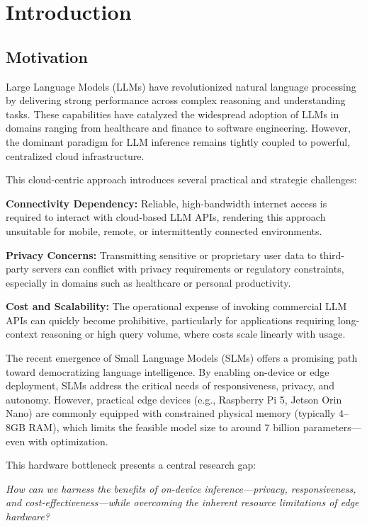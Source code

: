 \chapter{Introduction}
\label{chapter:intro}

\section{Motivation}
Large Language Models (LLMs) have revolutionized natural language processing by delivering strong performance across complex reasoning and understanding tasks. These capabilities have catalyzed the widespread adoption of LLMs in domains ranging from healthcare and finance to software engineering. However, the dominant paradigm for LLM inference remains tightly coupled to powerful, centralized cloud infrastructure.

This cloud-centric approach introduces several practical and strategic challenges:

\textbf{Connectivity Dependency:} Reliable, high-bandwidth internet access is required to interact with cloud-based LLM APIs, rendering this approach unsuitable for mobile, remote, or intermittently connected environments.

\textbf{Privacy Concerns:} Transmitting sensitive or proprietary user data to third-party servers can conflict with privacy requirements or regulatory constraints, especially in domains such as healthcare or personal productivity.

\textbf{Cost and Scalability:} The operational expense of invoking commercial LLM APIs can quickly become prohibitive, particularly for applications requiring long-context reasoning or high query volume, where costs scale linearly with usage.

The recent emergence of Small Language Models (SLMs) offers a promising path toward democratizing language intelligence. By enabling on-device or edge deployment, SLMs address the critical needs of responsiveness, privacy, and autonomy. However, practical edge devices (e.g., Raspberry Pi 5, Jetson Orin Nano) are commonly equipped with constrained physical memory (typically 4–8GB RAM), which limits the feasible model size to around 7 billion parameters—even with optimization.

This hardware bottleneck presents a central research gap:

\textit{How can we harness the benefits of on-device inference—privacy, responsiveness, and cost-effectiveness—while overcoming the inherent resource limitations of edge hardware?}

